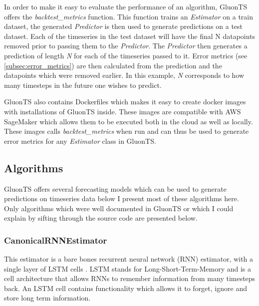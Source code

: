 In order to make it easy to evaluate the performance of an algorithm, GluonTS offers the \textit{backtest\_metrics} function. This function trains an \textit{Estimator} on a train dataset, the generated \textit{Predictor} is then used to generate predictions on a test dataset. Each of the timeseries in the test dataset will have the final N datapoints removed prior to passing them to the \textit{Predictor}.  The \textit{Predictor} then generates a prediction of length \textit{N} for each of the timeseries passed to it. Error metrics (see \ref{subsec:error_metrics}) are then calculated from the prediction and the datapoints which were removed earlier. In this example, \textit{N} corresponds to how many timesteps in the future one wishes to predict. 

GluonTS also contains Dockerfiles which makes it easy to create docker images with installations of GluonTS inside. These images are compatible with AWS SageMaker which allows them to be executed both in the cloud as well as locally. These images calls \textit{backtest\_metrics} when run and can thus be used to generate error metrics for any \textit{Estimator} class in GluonTS. 

\subsection{Algorithms}
GluonTS offers several forecasting models which can be used to generate predictions on timeseries data below I present most of these algorithms here. Only algorithms which were well documented in GluonTS \cite{gluonts-website} or which I could explain by sifting through the source code \cite{gluonts-github} are presented below.  

\subsubsection{CanonicalRNNEstimator}
This estimator is a bare bones recurrent neural network (RNN) estimator, with a single layer of LSTM cells \cite{gluonts-github}. LSTM stands for Long-Short-Term-Memory and is a cell architecture that allows RNNs to remember information from many timesteps back. An LSTM cell contains functionality which allows it to forget, ignore and store long term information. \cite{sherstinsky_fundamentals_2020}

